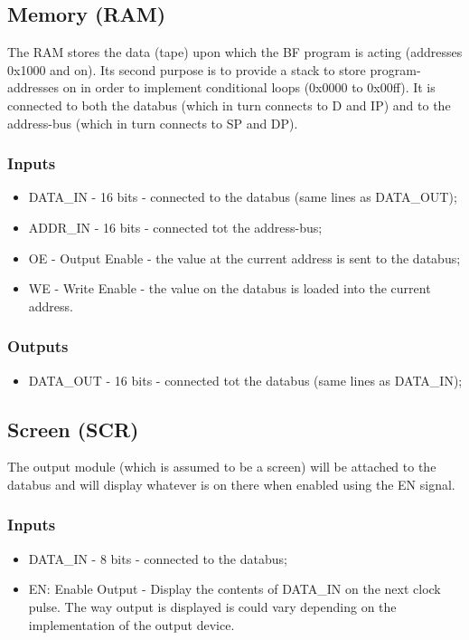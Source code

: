 \subsection{Memory (RAM)}  \label{sec:architecture:ram}
The RAM stores the data (tape) upon which the BF program is acting (addresses 0x1000 and on). Its second purpose is to provide a stack to store program-addresses on in order to implement conditional loops (0x0000 to 0x00ff). It is connected to both the databus (which in turn connects to D and IP) and to the address-bus (which in turn connects to SP and DP).

\subsubsection*{Inputs}
\begin{itemize}
\itemsep0em 
\item DATA\_IN - 16 bits - connected to the databus (same lines as DATA\_OUT);
\item ADDR\_IN - 16 bits - connected tot the address-bus;
\item OE - Output Enable - the value at the current address is sent to the databus;
\item WE - Write Enable - the value on the databus is loaded into the current address.
\end{itemize}

\subsubsection*{Outputs}
\begin{itemize}
\itemsep0em 
\item DATA\_OUT - 16 bits - connected tot the databus (same lines as DATA\_IN);
\end{itemize}

\subsection{Screen (SCR)}  \label{sec:architecture:scr}
The output module (which is assumed to be a screen) will be attached to the databus and will display whatever is on there when enabled using the EN signal.
\subsubsection*{Inputs}
\begin{itemize}
\itemsep0em 
\item DATA\_IN - 8 bits - connected to the databus;
\item EN: Enable Output - Display the contents of DATA\_IN on the next clock pulse. The way output is displayed is could vary depending on the implementation of the output device.
\end{itemize}

